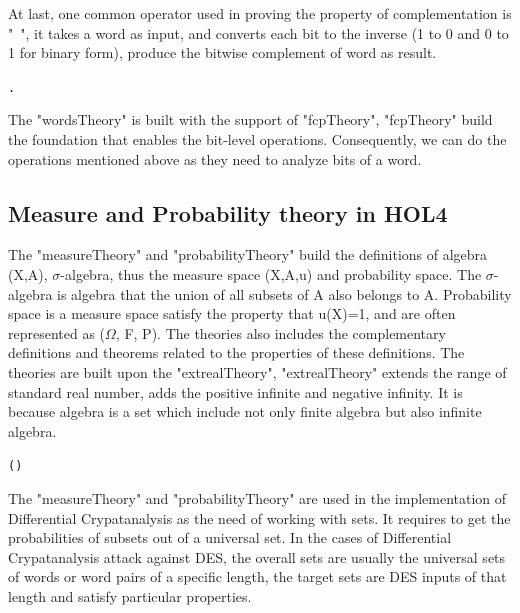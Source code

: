 \documentclass{article}
\begin{document}
At last, one common operator used in proving the property of complementation is "~", it takes a word as input, and converts
each bit to the inverse (1 to 0 and 0 to 1 for binary form), produce the bitwise complement of word as result.

\begin{alltt}
   \HOLTokenTurnstile{} \HOLSymConst{\HOLTokenNeg{}} \HOLSymConst{=}  . \HOLSymConst{\HOLTokenNeg{}}  
\end{alltt}

The "wordsTheory" is built with the support of "fcpTheory", "fcpTheory" build the foundation that enables the bit-level operations.
Consequently, we can do the operations mentioned above as they need to analyze bits of a word.

\subsection{Measure and Probability theory in HOL4}

The "measureTheory" and "probabilityTheory" build the definitions of algebra (X,A), \( \sigma \)-algebra, thus the measure space (X,A,u) and probability
space. The \( \sigma \)-algebra is algebra that the union of all subsets of A also belongs to A. Probability space is a measure space satisfy the
property that u(X)=1, and are often represented as (\( \Omega \), F, P). The theories also includes the complementary definitions and
theorems related to the properties of these definitions. The theories are built upon the "extrealTheory", "extrealTheory"
extends the range of standard real number, adds the positive infinite and negative infinity. It is because algebra is a set which
include not only finite algebra but also infinite algebra.

\begin{alltt}
   \HOLTokenTurnstile{}   \HOLSymConst{\HOLTokenEquiv{}}
    ( ) \HOLSymConst{\HOLTokenConj{}}   \HOLSymConst{\HOLTokenConj{}}
    
\end{alltt}

The "measureTheory" and "probabilityTheory" are used in the implementation of Differential Crypatanalysis as the need of working with
sets. It requires to get the probabilities of subsets out of a universal set. In the cases of Differential Crypatanalysis attack against
DES, the overall sets are usually the universal sets of words or word pairs of a specific length, the target sets are DES
inputs of that length and satisfy particular properties.
\end{document}
